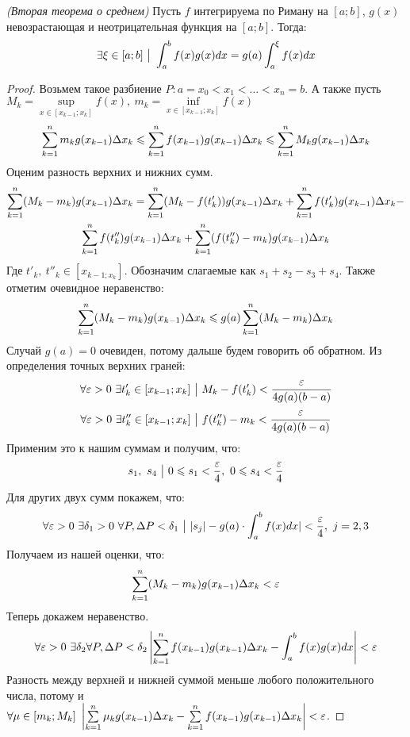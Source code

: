 \begin{theorem} \textit{(Вторая теорема о среднем)}
	Пусть $f$ интегрируема по Риману на $[a;b]$, $g(x)$ невозрастающая и неотрицательная функция на $[a;b]$. Тогда:
	\[
		\exists \xi \in [a;b] \ \big|\  \int_a^bf(x)g(x)dx = g(a)\int_a^\xi f(x)dx
	\]
\end{theorem}


\begin{proof}
	Возьмем такое разбиение $P : a = x_0 < x_1 < \ldots < x_n = b$. А также пусть $M_k = \sup\limits_{x \in [x_{k - 1};x_k]}f(x),\ m_k = \inf\limits_{x \in [x_{k - 1};x_k]}f(x)$
	\[
	 	\sum\limits_{k = 1}^nm_kg(x_{k - 1})\Delta x_k \leqslant	\sum\limits_{k = 1}^nf(x_{k - 1})g(x_{k - 1})\Delta x_k \leqslant \sum\limits_{k = 1}^nM_kg(x_{k - 1})\Delta x_k
	\]
	Оценим разность верхних и нижних сумм.
	\begin{multline*}
		\sum\limits_{k = 1}^n(M_k - m_k)g(x_{k - 1})\Delta x_k = \sum\limits_{k = 1}^n(M_k - f(t'_k))g(x_{k - 1})\Delta x_k + \sum\limits_{k = 1}^nf(t'_k)g(x_{k - 1})\Delta x_k -
		\\
		\sum\limits_{k = 1}^nf(t''_k)g(x_{k - 1})\Delta x_k + \sum\limits_{k = 1}^n(f(t''_k) - m_k)g(x_{k - 1})\Delta x_k
	\end{multline*}
	Где $t'_k,\ t''_k \in [x_{k - 1;x_k}]$.
	Обозначим слагаемые как $s_1 + s_2 - s_3 + s_4$.
	Также отметим очевидное неравенство:
	\[
		\sum\limits_{k = 1}^n(M_k - m_k)g(x_{k - 1})\Delta x_k \leqslant g(a)\sum\limits_{k = 1}^n(M_k - m_k)\Delta x_k
	\]
	Случай $g(a) = 0$ очевиден, потому дальше будем говорить об обратном.
	Из определения точных верхних граней:
	\[
		\forall \eps > 0\ \exists t'_k \in [x_{k - 1}; x_k] \such M_k - f(t'_k) < \frac{\eps}{4g(a)(b - a)}
	\]
	\[
			\forall \varepsilon > 0\ \exists t''_k \in [x_{k - 1}; x_k] \ \big|\  f(t''_k) - m_k < \frac{\varepsilon}{4g(a)(b - a)}
	\]
	Применим это к нашим суммам и получим, что:
	\[
		s_1,\ s_4 \ \big|\  0 \leqslant s_1 < \frac{\varepsilon}{4},\ 0 \leqslant s_4 < \frac{\varepsilon}{4}
	\]
	Для других двух сумм покажем, что:
	\[
		\forall \varepsilon > 0\ \exists \delta_1 > 0\ \forall P, \Delta P < \delta_1 \ \big|\  |s_j| - g(a)\cdot \int_a^bf(x)dx| < \frac{\varepsilon}{4},\ j = 2, 3
	\]
	Получаем из нашей оценки, что:
	\[
		\sum\limits_{k = 1}^n(M_k - m_k)g(x_{k - 1})\Delta x_k < \varepsilon
	\]
	Теперь докажем неравенство.
	\[
		\forall \varepsilon > 0\ \exists \delta_2 \forall P, \Delta P < \delta_2 \left|\sum\limits_{k = 1}^nf(x_{k - 1})g(x_{k - 1}) \Delta x_k - \int_a^bf(x)g(x)dx\right| < \varepsilon
	\]
	Разность между верхней и нижней суммой меньше любого положительного числа, потому и $\forall \mu \in [m_k;M_k]\ \left|\sum\limits_{k = 1}^n\mu_kg(x_{k - 1}) \Delta x_k - \sum\limits_{k = 1}^nf(x_{k - 1})g(x_{k - 1}) \Delta x_k \right| < \varepsilon$.

\end{proof}
